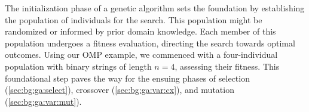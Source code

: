   The initialization phase of a genetic algorithm sets the foundation by 
  establishing the population of individuals for the search.
  This population might be randomized or informed by prior domain knowledge.
  Each member of this population undergoes a fitness evaluation, directing the 
  search towards optimal outcomes.
  Using our OMP example, we commenced with a four-individual population with 
  binary strings of length \(n = 4\), assessing their fitness.
  This foundational step paves the way for the ensuing phases of selection 
  (\vref{sec:bg:ga:select}), crossover 
  (\vref{sec:bg:ga:var:cx}), and mutation (\vref{sec:bg:ga:var:mut}).
